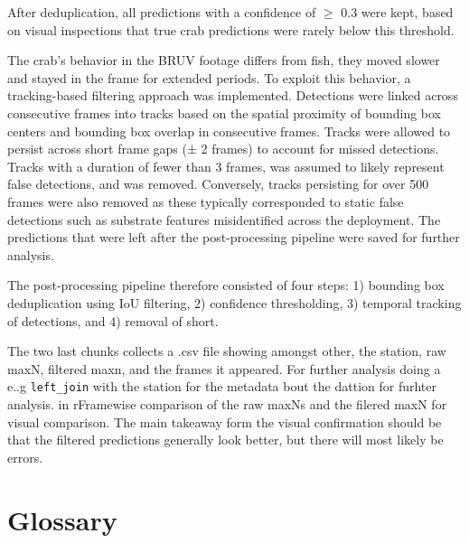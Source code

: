 \documentclass[
]{book}
\begin{document}
After deduplication, all predictions with a confidence of \(\geq\) 0.3 were kept, based on visual inspections that true crab predictions were rarely below this threshold.

The crab's behavior in the BRUV footage differs from fish, they moved slower and stayed in the frame for extended periods. To exploit this behavior, a tracking-based filtering approach was implemented. Detections were linked across consecutive frames into tracks based on the spatial proximity of bounding box centers and bounding box overlap in consecutive frames. Tracks were allowed to persist across short frame gaps (± 2 frames) to account for missed detections. Tracks with a duration of fewer than 3 frames, was assumed to likely represent false detections, and was removed. Conversely, tracks persisting for over 500 frames were also removed as these typically corresponded to static false detections such as substrate features misidentified across the deployment. The predictions that were left after the post-processing pipeline were saved for further analysis.

The post-processing pipeline therefore consisted of four steps: 1) bounding box deduplication using IoU filtering, 2) confidence thresholding, 3) temporal tracking of detections, and 4) removal of short.

The two last chunks collects a .csv file showing amongst other, the station, raw maxN, filtered maxn, and the frames it appeared. For further analysis doing a e..g \texttt{left\_join} with the station for the metadata bout the dattion for furhter analysis. in rFramewise comparison of the raw maxNs and the filered maxN for visual comparison. The main takeaway form the visual confirmation should be that the filtered predictions generally look better, but there will most likely be errors.

\chapter{Glossary}\label{glossary}
\end{document}
